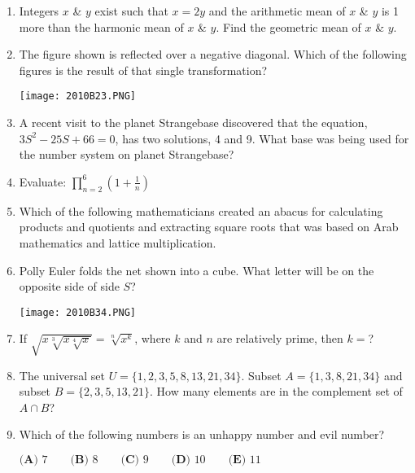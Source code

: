 \documentclass[../uilmath.tex]{subfiles}
\begin{document}
\begin{enumerate}[label=\bfseries\arabic*.]
    \item %
    Integers $x$ \& $y$ exist such that $x=2y$ and the arithmetic mean of $x$ \& $y$ is 1 more than the harmonic mean of $x$ \& $y$. Find the geometric mean of $x$ \& $y$.

    \item %
    The figure shown is reflected over a negative diagonal. Which of the following figures is the result of that single transformation?
    \begin{center}
        \texttt{[image: 2010B23.PNG]}
    \end{center}

    \item %
    A recent visit to the planet Strangebase discovered that the equation, $3S^2-25S+66=0$, has two solutions, 4 and 9. What base was being used for the number system on planet Strangebase?

    \item %
    Evaluate: $\prod_{n=2}^6 (1+\frac{1}{n})$

    \item %
    Which of the following mathematicians created an abacus for calculating products and quotients and extracting square roots that was based on Arab mathematics and lattice multiplication.

    \item %
    Polly Euler folds the net shown into a cube. What letter will be on the opposite side of side $S$?
    \begin{center}
        \texttt{[image: 2010B34.PNG]}
    \end{center}

    \item %
    If $\sqrt{x\sqrt[3]{x\sqrt[4]{x}}}=\sqrt[n]{x^k}$, where $k$ and $n$ are relatively prime, then $k=$?

    \item %
    The universal set $U=\{1,2,3,5,8,13,21,34\}$. Subset $A=\{1,3,8,21,34\}$ and subset $B=\{2,3,5,13,21\}$. How many elements are in the complement set of $A\cap B$?

    \item %
    Which of the following numbers is an unhappy number and evil number?

    $\textbf{(A) } 7 \qquad \textbf{(B) } 8 \qquad \textbf{(C) } 9 \qquad \textbf{(D) } 10 \qquad \textbf{(E) } 11$


\end{enumerate}
\end{document}
